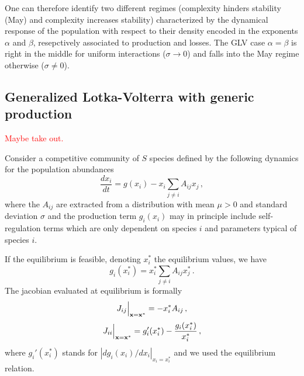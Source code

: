 \documentclass[10pt]{article}
\begin{document}
One can therefore identify two different regimes (complexity hinders stability (May) and 
complexity increases stability)
characterized by the dynamical response of the population with respect to their density
encoded in the exponents $\alpha$ and $\beta$, resepctively associated
to production and losses. The GLV case $\alpha=\beta$ is right in the middle for uniform
interactions ($\sigma\to0$) and falls into the May regime otherwise ($\sigma\neq0$). 

\subsection{Generalized Lotka-Volterra with generic production}
\textcolor{red}{Maybe take out.}

Consider a competitive community of $S$ species
defined by the following dynamics for the population abundances
\begin{equation}
    \frac{dx_i}{dt}=g(x_i)-x_i\sum_{j\neq i}A_{ij}x_j \, ,
\end{equation}
where the $A_{ij}$ are extracted from a distribution
with mean $\mu>0$ and standard deviation $\sigma$ and
the production term $g_i(x_i)$ may in principle include
self-regulation terms which are only dependent on species $i$
and parameters typical of species $i$.

If the equilibrium is feasible, denoting $x_i^*$ the equilibrium values,
we have
\begin{equation}
    g_i(x_i^*)=x_i^*\sum_{j\neq i}A_{ij}x_j^* \, .
\end{equation}
The jacobian evaluated at equilibrium is formally
\begin{equation}
    J_{ij}\Big{|}_{\bf{x}=\bf{x}^*} = -x_i^*A_{ij} \, ,
\end{equation}
\begin{equation}
    J_{ii}\Big{|}_{\bf{x}=\bf{x}^*} =  g_i'(x_i^*)-\frac{g_i(x_i^*)}{x_i^*}\, ,
\end{equation}
where $g_i'(x_i^*)$ stands for $|d g_i(x_i)/d x_i|_{x_i=x_i^*}$ 
and we used the equilibrium relation.
\end{document}
